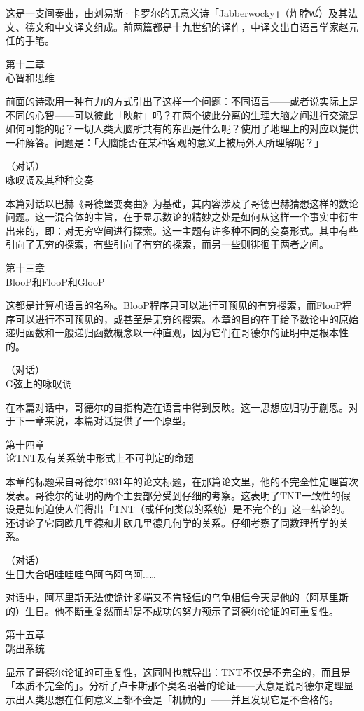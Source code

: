 \documentclass[
  12pt,
  twoside,
  openright,
  oldfontcommands,
]{memoir}
\begin{document}
这是一支间奏曲，由刘易斯·卡罗尔的无意义诗「Jabberwocky」（炸脖{\gebfont ꪡ}）及其法文、德文和中文译文组成。前两篇都是十九世纪的译作，中译文出自语言学家赵元任的手笔。

第十二章\\
{心智和思维}

前面的诗歌用一种有力的方式引出了这样一个问题：不同语言------或者说实际上是不同的心智------可以彼此「映射」吗？在两个彼此分离的生理大脑之间进行交流是如何可能的呢？一切人类大脑所共有的东西是什么呢？使用了地理上的对应以提供一种解答。问题是：「大脑能否在某种客观的意义上被局外人所理解呢？」

（对话）\\
{咏叹调及其种种变奏}

本篇对话以巴赫《哥德堡变奏曲》为基础，其内容涉及了哥德巴赫猜想这样的数论问题。这一混合体的主旨，在于显示数论的精妙之处是如何从这样一个事实中衍生出来的，即：对无穷空间进行探索。这一主题有许多种不同的变奏形式。其中有些引向了无穷的探索，有些引向了有穷的探索，而另一些则徘徊于两者之间。

第十三章\\
{BlooP和FlooP和GlooP}

这都是计算机语言的名称。BlooP程序只可以进行可预见的有穷搜索，而FlooP程序可以进行不可预见的，或甚至是无穷的搜索。本章的目的在于给予数论中的原始递归函数和一般递归函数概念以一种直观，因为它们在哥德尔的证明中是根本性的。

（对话）\\
{G弦上的咏叹调}

在本篇对话中，哥德尔的自指构造在语言中得到反映。这一思想应归功于蒯恩。对于下一章来说，本篇对话提供了一个原型。

第十四章\\
{论TNT及有关系统中形式上不可判定的命题}

本章的标题采自哥德尔1931年的论文标题，在那篇论文里，他的不完全性定理首次发表。哥德尔的证明的两个主要部分受到仔细的考察。这表明了TNT一致性的假设是如何迫使人们得出「TNT（或任何类似的系统）是不完全的」这一结论的。还讨论了它同欧几里德和非欧几里德几何学的关系。仔细考察了同数理哲学的关系。

（对话）\\
{生日大合唱哇哇哇乌阿乌阿乌阿\ldots\ldots{}}

对话中，阿基里斯无法使诡计多端又不肯轻信的乌龟相信今天是他的（阿基里斯的）生日。他不断重复然而却是不成功的努力预示了哥德尔论证的可重复性。

第十五章\\
{跳出系统}

显示了哥德尔论证的可重复性，这同时也就导出：TNT不仅是不完全的，而且是「本质不完全的」。分析了卢卡斯那个臭名昭著的论证------大意是说哥德尔定理显示出人类思想在任何意义上都不会是「机械的」------并且发现它是不合格的。
\end{document}
